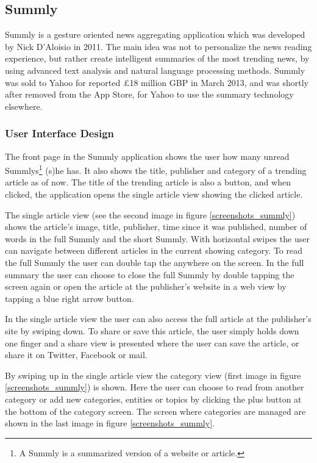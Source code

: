 \subsection{Summly}

Summly is a gesture oriented news aggregating application which was developed by Nick D'Aloisio in 2011. The main idea was not to personalize the news reading experience, but rather create intelligent summaries of the most trending news, by using advanced text analysis and natural language processing methods\cite{summly_idea}. Summly was sold to Yahoo for reported £18 million GBP in March 2013\cite{summly_sold_yahoo}, and was shortly after removed from the App Store, for Yahoo to use the summary technology elsewhere\cite{summly_closed}.

\subsubsection{User Interface Design}

The front page in the Summly application shows the user how many unread Summlys\footnote{A Summly is a summarized version of a website or article.} (s)he has. It also shows the title, publisher and category of a trending article as of now. The title of the trending article is also a button, and when clicked, the application opens the single article view showing the clicked article. 

The single article view (see the second image in figure \ref{screenshots_summly}) shows the article's image, title, publisher, time since it was published, number of words in the full Summly and the short Summly. With horizontal swipes the user can navigate between different articles in the current showing category. To read the full Summly the user can double tap the anywhere on the screen. In the full summary the user can choose to close the full Summly by double tapping the screen again or open the article at the publisher's website in a web view by tapping a blue right arrow button.

In the single article view the user can also access the full article at the publisher's site by swiping down. To share or save this article, the user simply holds down one finger and a share view is presented where the user can save the article, or share it on Twitter, Facebook or mail.

By swiping up in the single article view the category view (first image in figure \ref{screenshots_summly}) is shown. Here the user can choose to read from another category or add new categories, entities or topics by clicking the plus button at the bottom of the category screen. The screen where categories are managed are shown in the last image in figure \ref{screenshots_summly}.

